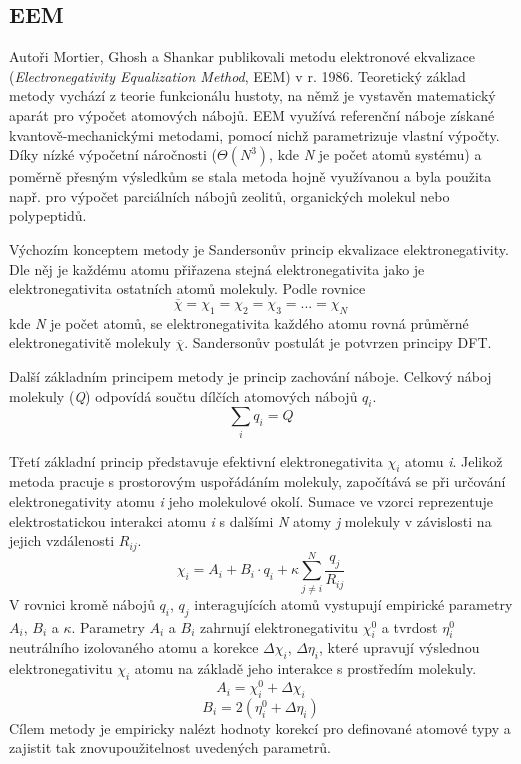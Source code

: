 \subsection{EEM}
Autoři Mortier, Ghosh a Shankar publikovali metodu elektronové ekvalizace (\textit{Electronegativity Equalization Method}, EEM) v r. 1986. Teoretický základ metody vychází z teorie funkcionálu hustoty, na němž je vystavěn matematický aparát pro výpočet atomových nábojů. EEM využívá referenční náboje získané kvantově-mechanickými metodami, pomocí nichž parametrizuje vlastní výpočty. Díky nízké výpočetní náročnosti ($\Theta(N^3)$, kde \textit{N} je počet atomů systému) a poměrně přesným výsledkům se stala metoda hojně využívanou a byla použita např. pro výpočet parciálních nábojů zeolitů, organických molekul nebo polypeptidů.

Výchozím konceptem metody je Sandersonův princip ekvalizace elektronegativity. Dle něj je každému atomu přiřazena stejná elektronegativita jako je elektronegativita ostatních atomů molekuly. Podle rovnice 
\begin{equation}
\label{Sanders}
    \overline{\chi} = \chi_1 = \chi_2 = \chi_3 = ... = \chi_N
\end{equation}
kde \textit{N} je počet atomů, se elektronegativita každého atomu rovná průměrné elektronegativitě molekuly $\overline{\chi}$. Sandersonův postulát je potvrzen principy DFT. %

Další základním principem metody je princip zachování náboje. Celkový náboj molekuly (\textit{Q}) odpovídá součtu dílčích atomových nábojů $q_i$.
\begin{equation}
\label{EEM_chargesum}
    \sum_{i} q_i = Q
\end{equation}

Třetí základní princip představuje efektivní elektronegativita $\chi_i$ atomu \textit{i}. Jelikož metoda pracuje s prostorovým uspořádáním molekuly, započítává se při určování elektronegativity atomu \textit{i} jeho molekulové okolí. Sumace ve vzorci reprezentuje elektrostatickou interakci atomu \textit{i} s dalšími \textit{N} atomy \textit{j} molekuly  v závislosti na jejich vzdálenosti $R_{ij}$.
\begin{equation}
\label{EEM_elneg}
    \chi_i = A_i + B_i\cdot q_i + \kappa \sum_{j \neq i}^{N} \frac{q_j}{R_{ij}}
\end{equation}
V rovnici kromě nábojů $q_i$, $q_j$ interagujících atomů vystupují empirické parametry $A_i$, $B_i$ a $\kappa$. Parametry  $A_i$ a $B_i$ zahrnují elektronegativitu $\chi_{i}^{0}$ a tvrdost $\eta_{i}^{0}$ neutrálního izolovaného atomu a korekce $\Delta \chi_i$, $\Delta \eta_i$, které upravují výslednou elektronegativitu $\chi_i$ atomu na základě jeho interakce s prostředím molekuly. 
\begin{equation}
    A_i = \chi_{i}^{0} + \Delta \chi_i
\end{equation}
\begin{equation}
        B_i = 2(\eta_{i}^{0} + \Delta \eta_i)
\end{equation}
Cílem metody je empiricky nalézt hodnoty korekcí pro definované atomové typy a zajistit tak znovupoužitelnost uvedených parametrů. 

